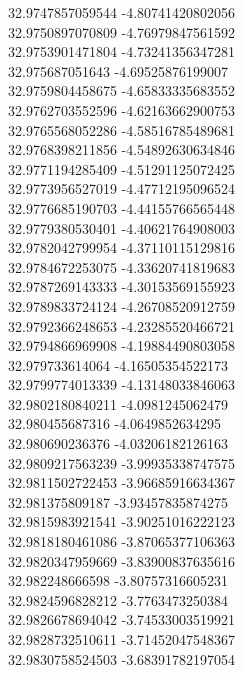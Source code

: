 {32.9747857059544	-4.80741420802056\\
32.9750897070809	-4.76979847561592\\
32.9753901471804	-4.73241356347281\\
32.975687051643	-4.69525876199007\\
32.9759804458675	-4.65833335683552\\
32.9762703552596	-4.62163662900753\\
32.9765568052286	-4.58516785489681\\
32.9768398211856	-4.54892630634846\\
32.9771194285409	-4.51291125072425\\
32.9773956527019	-4.47712195096524\\
32.9776685190703	-4.44155766565448\\
32.9779380530401	-4.40621764908003\\
32.9782042799954	-4.37110115129816\\
32.9784672253075	-4.33620741819683\\
32.9787269143333	-4.30153569155923\\
32.9789833724124	-4.26708520912759\\
32.9792366248653	-4.23285520466721\\
32.9794866969908	-4.19884490803058\\
32.979733614064	-4.16505354522173\\
32.9799774013339	-4.13148033846063\\
32.9802180840211	-4.0981245062479\\
32.980455687316	-4.0649852634295\\
32.980690236376	-4.03206182126163\\
32.9809217563239	-3.99935338747575\\
32.9811502722453	-3.96685916634367\\
32.981375809187	-3.93457835874275\\
32.9815983921541	-3.90251016222123\\
32.9818180461086	-3.87065377106363\\
32.9820347959669	-3.83900837635616\\
32.982248666598	-3.80757316605231\\
32.9824596828212	-3.7763473250384\\
32.9826678694042	-3.74533003519921\\
32.9828732510611	-3.71452047548367\\
32.9830758524503	-3.68391782197054\\
}
